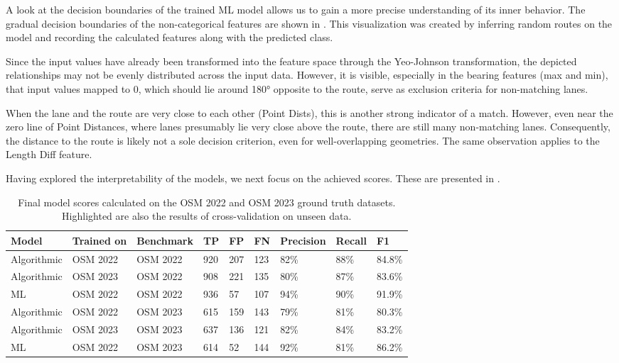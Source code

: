 A look at the decision boundaries of the trained ML model allows us to gain a more precise understanding of its inner behavior. The gradual decision boundaries of the non-categorical features are shown in . This visualization was created by inferring random routes on the model and recording the calculated features along with the predicted class. 

Since the input values have already been transformed into the feature space through the Yeo-Johnson transformation, the depicted relationships may not be evenly distributed across the input data. However, it is visible, especially in the bearing features (max and min), that input values mapped to 0, which should lie around 180° opposite to the route, serve as exclusion criteria for non-matching lanes.

When the lane and the route are very close to each other (Point Dists), this is another strong indicator of a match. However, even near the zero line of Point Distances, where lanes presumably lie very close above the route, there are still many non-matching lanes. Consequently, the distance to the route is likely not a sole decision criterion, even for well-overlapping geometries. The same observation applies to the Length Diff feature.

Having explored the interpretability of the models, we next focus on the achieved scores. These are presented in .

\begin{table}[ht]
\caption{Final model scores calculated on the OSM 2022 and OSM 2023 ground truth datasets. Highlighted are also the results of cross-validation on unseen data.}
\begin{tabular}{@{}lllllllll@{}}
\toprule
\textbf{Model} & \textbf{Trained on} & \textbf{Benchmark} & \textbf{TP} & \textbf{FP} & \textbf{FN} & \textbf{Precision} & \textbf{Recall} & \textbf{F1} \\
\midrule
Algorithmic & OSM 2022 & OSM 2022 & 920 & 207 & 123 & 82\% & 88\% & 84.8\% \\
Algorithmic & OSM 2023 & OSM 2022 & 908 & 221 & 135 & 80\% & 87\% & 83.6\% \\
ML & OSM 2022 & OSM 2022 & 936 & 57 & 107 & 94\% & 90\% & 91.9\% \\
\midrule
Algorithmic & OSM 2022 & OSM 2023 & 615 & 159 & 143 & 79\% & 81\% & 80.3\% \\
Algorithmic & OSM 2023 & OSM 2023 & 637 & 136 & 121 & 82\% & 84\% & 83.2\% \\
ML & OSM 2022 & OSM 2023 & 614 & 52 & 144 & 92\% & 81\% & 86.2\% \\
\bottomrule
\end{tabular}
\label{tab:model-scores}
\end{table}

